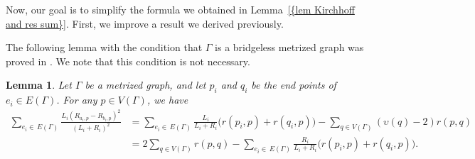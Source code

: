 \documentclass[12pt]{amsart}
\newtheorem{lemma}[theorem]{Lemma}
\theoremstyle{example}
\theoremstyle{definition}
\theoremstyle{notation}
\begin{document}
Now, our goal is to simplify the formula we obtained in {Lemma~\ref{{lem Kirchhoff and res sum}}}. First, we improve a result we derived previously.

The following lemma with the condition that ${\Gamma}$ is a bridgeless metrized graph was proved in \cite[Lemma 3.10]{C7}. We note that this condition is not necessary.
\begin{lemma}\label{lem term2}
Let ${\Gamma}$ be a metrized graph, and let ${p_{i}}$ and ${q_{i}}$ be the end points of $e_i \in {E({\Gamma})}$. For any $p
\in {V({\Gamma})}$, we have
\begin{equation*}
\begin{split}
\sum_{e_i \in \,
{E({\Gamma})}}\frac{{L_{i}}(R_{a_{i},p}-R_{b_{i},p})^2}{({L_{i}}+{R_{i}})^2} &
=\sum_{e_i \in \, {E({\Gamma})}}\frac{L_{i}}{{L_{i}} + {R_{i}}}
\big(r({p_{i}},p)+r({q_{i}},p)\big) - \sum_{q \in
{V({\Gamma})}}({\upsilon}(q)-2)r(p,q)\\
& = 2\sum_{q \in {V({\Gamma})}}r(p,q) -\sum_{e_i \in \,
{E({\Gamma})}}\frac{R_{i}}{{L_{i}} + {R_{i}}} \big(r({p_{i}},p)+r({q_{i}},p)\big).
\end{split}
\end{equation*}
\end{lemma}
\end{document}
